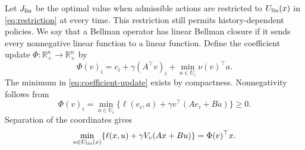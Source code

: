 \documentclass[10pt]{article}
\newcommand{\R}{\mathbb R}
\begin{document}
Let $J_{\rm lin}$ be the optimal value when admissible actions are restricted to $U_{\rm lin}(x)$ in \eqref{eq:restriction} at every time. This restriction still permits history-dependent policies. We say that a Bellman operator has linear Bellman closure if it sends every nonnegative linear function to a linear function. Define the coefficient update $\Phi:\R_+^n\to\R_+^n$ by
\begin{equation}
 \Phi(v)_i=c_i+\gamma(A^\top v)_i
       +\min_{a\in U_i}\nu(v)^\top a.
 \label{eq:coefficient-update}
\end{equation}
The minimum in \eqref{eq:coefficient-update} exists by compactness. Nonnegativity follows from
\[
 \Phi(v)_i=\min_{a\in U_i}\{\ell(e_i,a)+\gamma v^\top(Ae_i+Ba)\}\ge0.
\]
Separation of the coordinates gives
\begin{equation}
 \min_{u\in U_{\rm lin}(x)}\{\ell(x,u)+\gamma V_v(Ax+Bu)\}
 =\Phi(v)^\top x.
 \label{eq:restricted-bellman}
\end{equation}
\end{document}
